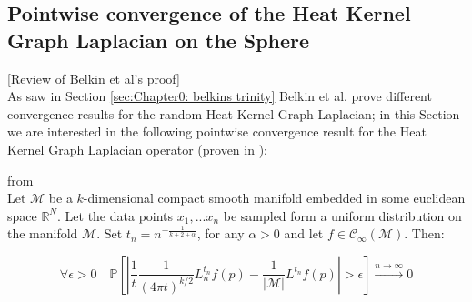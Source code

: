 \subsection{Pointwise convergence of the Heat Kernel Graph Laplacian on the Sphere}
\label{sec:pointwise convergence of the Heat Kernel Graph Laplacian on the Sphere}
[Review of Belkin et al's proof]\\ 
As saw in Section \ref{sec:Chapter0: belkins trinity} Belkin et al. prove different convergence results for the random Heat Kernel Graph Laplacian; in this Section we are interested in the following pointwise convergence result for the Heat Kernel Graph Laplacian operator (proven in \cite{Belkin:2005:TTF:2138147.2138189}):
\vspace{0.5cm}
\begin{theorem}{from \cite[Belkin et al.]{Belkin:2005:TTF:2138147.2138189}}\\
	\label{theo:Belkin pointwise convergence}
	Let $\mathcal M$ be a $k$-dimensional compact smooth manifold embedded in some euclidean space $\mathbb R^N$. Let the data points $x_1, ... x_n$ be sampled form a uniform distribution on the manifold $\mathcal M$. Set $t_n=n^{-\frac{1}{k+2+\alpha}}$, for any $\alpha>0$ and let $f\in\mathcal C_\infty(\mathcal M)$. Then:
	
	$$\forall \epsilon>0\quad \mathbb{P}\left[\left|\frac{1}{t}\frac{1}{(4 \pi t)^{k/2}}L_{n}^{t_n} f(p)-  \frac{1}{|\mathcal M|}L^{t_n} f(p)\right|>\epsilon\right] \xrightarrow{n\to\infty} 0$$
\end{theorem}
\vspace{0.5cm}

